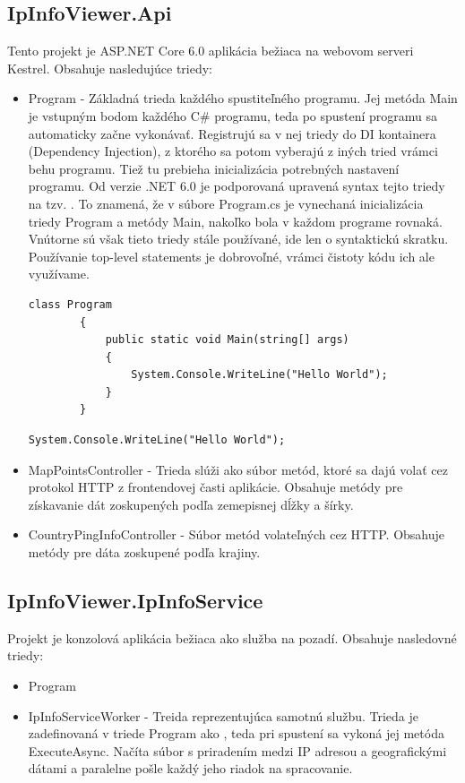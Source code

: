 \subsection{IpInfoViewer.Api}
Tento projekt je ASP.NET Core 6.0 aplikácia bežiaca na webovom serveri Kestrel. Obsahuje nasledujúce triedy: 
\begin{itemize}
    \item Program
    - Základná trieda každého spustiteľného programu. Jej metóda Main je vstupným bodom každého C\# programu, teda po spustení programu sa automaticky 
    začne vykonávať. Registrujú sa v nej triedy do DI kontainera (Dependency Injection), z ktorého sa potom vyberajú z iných tried vrámci behu programu. 
    Tiež tu prebieha inicializácia potrebných nastavení programu. Od verzie .NET 6.0 je podporovaná upravená syntax tejto triedy na tzv. . 
    To znamená, že v súbore Program.cs je vynechaná inicializácia triedy Program a metódy Main, nakoľko bola v každom 
    programe rovnaká. Vnútorne sú však tieto triedy stále používané, ide len o syntaktickú skratku. Používanie top-level statements 
    je dobrovoľné, vrámci čistoty kódu ich ale využívame.
    \begin{lstlisting}[language={[Sharp]C},caption={Ukážka kódu triedy Program bez použitia \uv{top-level statements}},label=alg:Program_Old]
        class Program 
        {
            public static void Main(string[] args) 
            {
                System.Console.WriteLine("Hello World");
            }
        }
    \end{lstlisting}
    \begin{lstlisting}[language={[Sharp]C},caption={Ukážka kódu triedy Program s použitím \uv{top-level statements}},label=alg:Program_New]
        System.Console.WriteLine("Hello World");
    \end{lstlisting}
    \item MapPointsController
    - Trieda slúži ako súbor metód, ktoré sa dajú volať cez protokol HTTP z frontendovej časti aplikácie. Obsahuje metódy pre získavanie 
    dát zoskupených podľa zemepisnej dĺžky a šírky.
    \item CountryPingInfoController
    - Súbor metód volateľných cez HTTP. Obsahuje metódy pre dáta zoskupené podľa krajiny.
\end{itemize}
\subsection{IpInfoViewer.IpInfoService}
Projekt je konzolová aplikácia bežiaca ako služba na pozadí. Obsahuje nasledovné triedy:
\begin{itemize}
    \item Program
    \item IpInfoServiceWorker
    - Treida reprezentujúca samotnú službu. Trieda je zadefinovaná v triede Program ako , teda pri spustení sa vykoná jej metóda ExecuteAsync. 
    Načíta súbor s priradením medzi IP adresou a geografickými dátami a paralelne pošle každý jeho riadok na spracovanie.
\end{itemize}
